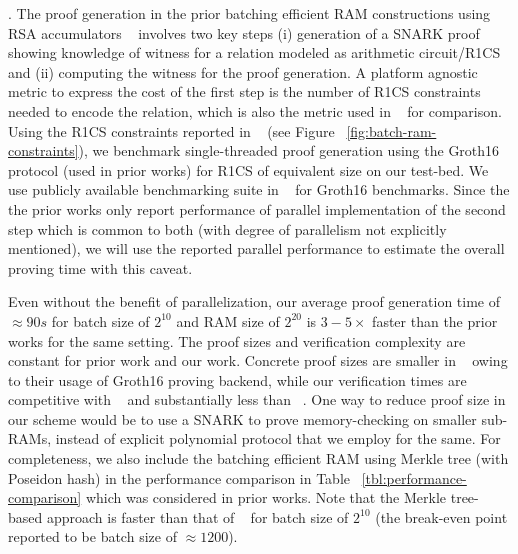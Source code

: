 . The proof generation in the prior batching efficient RAM constructions
using RSA accumulators ~\cite{USENIX:OWWB20,CCS:CFHKKO22} involves two key steps (i) generation of a SNARK
proof showing knowledge of witness for a relation modeled as arithmetic circuit/R1CS and (ii) computing the witness
for the proof generation. A platform agnostic metric to express the cost of the first step is the number of R1CS
constraints needed to encode the relation, which is also the metric used in ~\cite{CCS:CFHKKO22} for comparison.
Using the R1CS constraints reported in ~\cite{USENIX:OWWB20,CCS:CFHKKO22} (see Figure ~\ref{fig:batch-ram-constraints}),
we benchmark single-threaded proof generation
using the \textsf{Groth16} protocol (used in prior works) for R1CS of equivalent size on our test-bed. We use publicly
available benchmarking suite in ~\cite{ark-groth-16} for \textsf{Groth16} benchmarks. Since the
the prior works only report performance of parallel implementation of the second step which is common to both (with
degree of parallelism not explicitly mentioned), we will use the reported parallel performance to estimate the
overall proving time with this caveat. 

Even without the benefit of parallelization, our average proof generation
time of $\approx 90s$ for batch size of $2^{10}$ and RAM size of $2^{20}$ is $3-5\times$ faster than the prior works
for the same setting. The proof sizes and verification complexity are constant for prior work and our work.
Concrete proof sizes are smaller in ~\cite{USENIX:OWWB20,CCS:CFHKKO22} owing to their usage of \textsf{Groth16}
proving backend, while our verification times are competitive with ~\cite{USENIX:OWWB20} and substantially
less than ~\cite{CCS:CFHKKO22}. One way to reduce proof size in our scheme would be to use a SNARK to prove
memory-checking on smaller sub-RAMs, instead of explicit polynomial protocol that we employ for the same. For
completeness, we also include the batching efficient RAM using Merkle tree (with Poseidon hash) in the performance
comparison in Table ~\ref{tbl:performance-comparison} which was considered in prior works. Note that the Merkle
 tree-based approach is faster than that of ~\cite{USENIX:OWWB20} for batch size of $2^{10}$ (the break-even
 point reported to be batch size of $\approx 1200$).

